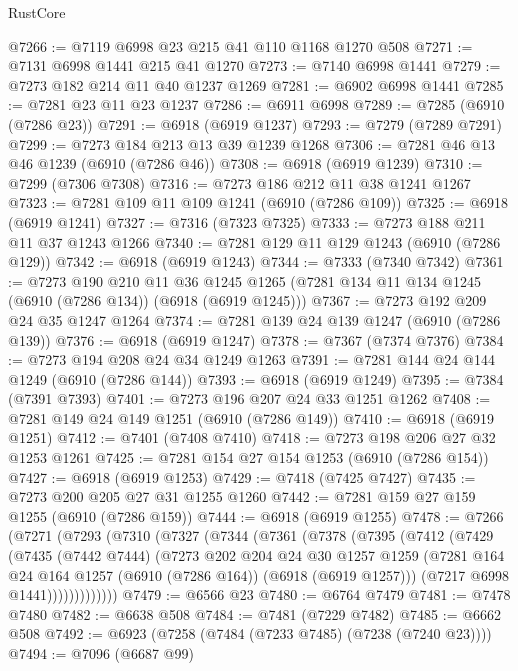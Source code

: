 \begin{lexlean}{RustCore}
\begin{coremodule}
@7266 := @7119 @6998 @23 @215 @41 @110 @1168 @1270 @508
@7271 := @7131 @6998 @1441 @215 @41 @1270
@7273 := @7140 @6998 @1441
@7279 := @7273 @182 @214 @11 @40 @1237 @1269
@7281 := @6902 @6998 @1441
@7285 := @7281 @23 @11 @23 @1237
@7286 := @6911 @6998
@7289 := @7285 (@6910 (@7286 @23))
@7291 := @6918 (@6919 @1237)
@7293 := @7279 (@7289 @7291)
@7299 := @7273 @184 @213 @13 @39 @1239 @1268
@7306 := @7281 @46 @13 @46 @1239 (@6910 (@7286 @46))
@7308 := @6918 (@6919 @1239)
@7310 := @7299 (@7306 @7308)
@7316 := @7273 @186 @212 @11 @38 @1241 @1267
@7323 := @7281 @109 @11 @109 @1241 (@6910 (@7286 @109))
@7325 := @6918 (@6919 @1241)
@7327 := @7316 (@7323 @7325)
@7333 := @7273 @188 @211 @11 @37 @1243 @1266
@7340 := @7281 @129 @11 @129 @1243 (@6910 (@7286 @129))
@7342 := @6918 (@6919 @1243)
@7344 := @7333 (@7340 @7342)
@7361 := @7273
    @190
    @210
    @11
    @36
    @1245
    @1265
    (@7281 @134 @11 @134 @1245 (@6910 (@7286 @134)) (@6918 (@6919 @1245)))
@7367 := @7273 @192 @209 @24 @35 @1247 @1264
@7374 := @7281 @139 @24 @139 @1247 (@6910 (@7286 @139))
@7376 := @6918 (@6919 @1247)
@7378 := @7367 (@7374 @7376)
@7384 := @7273 @194 @208 @24 @34 @1249 @1263
@7391 := @7281 @144 @24 @144 @1249 (@6910 (@7286 @144))
@7393 := @6918 (@6919 @1249)
@7395 := @7384 (@7391 @7393)
@7401 := @7273 @196 @207 @24 @33 @1251 @1262
@7408 := @7281 @149 @24 @149 @1251 (@6910 (@7286 @149))
@7410 := @6918 (@6919 @1251)
@7412 := @7401 (@7408 @7410)
@7418 := @7273 @198 @206 @27 @32 @1253 @1261
@7425 := @7281 @154 @27 @154 @1253 (@6910 (@7286 @154))
@7427 := @6918 (@6919 @1253)
@7429 := @7418 (@7425 @7427)
@7435 := @7273 @200 @205 @27 @31 @1255 @1260
@7442 := @7281 @159 @27 @159 @1255 (@6910 (@7286 @159))
@7444 := @6918 (@6919 @1255)
@7478 := @7266
    (@7271
      (@7293
        (@7310
          (@7327
            (@7344
              (@7361
                (@7378
                  (@7395
                    (@7412
                      (@7429
                        (@7435
                          (@7442 @7444)
                          (@7273
                            @202
                            @204
                            @24
                            @30
                            @1257
                            @1259
                            (@7281 @164 @24 @164 @1257 (@6910 (@7286 @164)) (@6918 (@6919 @1257)))
                            (@7217 @6998 @1441)))))))))))))
@7479 := @6566 @23
@7480 := @6764 @7479
@7481 := @7478 @7480
@7482 := @6638 @508
@7484 := @7481 (@7229 @7482)
@7485 := @6662 @508
@7492 := @6923 (@7258 (@7484 (@7233 @7485) (@7238 (@7240 @23))))
@7494 := @7096 (@6687 @99)

\end{coremodule}
\end{lexlean}
